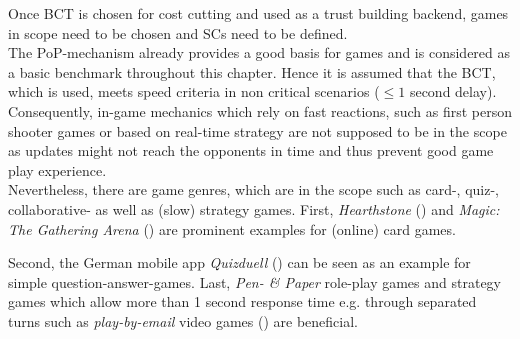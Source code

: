 Once \gls{BCT} is chosen for cost cutting and used as a trust building backend, games in scope need to be chosen and \gls{SC}s need to be defined. \\
The PoP-mechanism already provides a good basis for games and is considered as a basic benchmark throughout this chapter.
Hence it is assumed that the \gls{BCT}, which is used, meets speed criteria in non critical scenarios ($\leq 1$ second delay). \\
Consequently, in-game mechanics which rely on fast reactions, such as first person
shooter games or based on real-time strategy are not supposed to be in the scope as updates might not reach the opponents in time and thus prevent good game play experience. \\
Nevertheless, there are game genres, which are in the scope such as card-, quiz-, collaborative- as well as (slow) strategy games.
First, \textit{Hearthstone} (\citet{playhearthstone.com.2021}) and \textit{Magic: The Gathering Arena} (\citet{magic.wizards.com.2021}) are prominent examples for (online) card games.
\begin{figure}
\end{figure}
Second, the German mobile app
\textit{Quizduell} (\citet{Quizduell.2021}) can be seen as an example for simple question-answer-games.
Last, \textit{Pen- \& Paper} role-play games and strategy games which allow more than 1 second response time e.g. through separated turns such as \textit{play-by-email} video
games (\citet{Wikipedia.2021b}) are beneficial. \\
